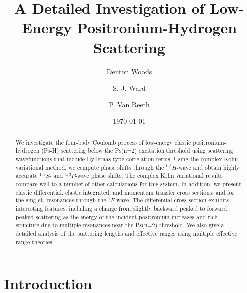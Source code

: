 \documentclass[preprint,showpacs,showkeys,preprintnumbers,amsmath,amssymb,longbibliography,pra,aps]{revtex4-1}
\begin{document}

\title{A Detailed Investigation of Low-Energy Positronium-Hydrogen Scattering}

\author{Denton Woods}

\author{S. J. Ward}

\author{P. Van Reeth}

\date{\today}

\begin{abstract}
We investigate the four-body Coulomb process of low-energy elastic
positronium-hydrogen (Ps-H) scattering below the Ps(n=2) excitation threshold
using scattering wavefunctions that include Hylleraas-type 
correlation terms. Using the complex Kohn variational method, we 
compute phase shifts through the $^{1,3}H$-wave and obtain highly accurate
$^{1,3}S$- and $^{1,3}P$-wave phase shifts. The complex
Kohn variational results compare well to a number of other calculations for 
this system. In addition, we present elastic 
differential, elastic integrated, and momentum transfer
cross sections, and for the singlet, resonances through the
$^1F$-wave. The differential cross section exhibits interesting features,
including a change from slightly backward peaked to
forward peaked scattering as the energy of the incident
positronium increases and
rich structure due to multiple resonances near the Ps(n=2) threshold.
We also give a detailed analysis of the scattering lengths
and effective ranges using multiple effective range theories.
\end{abstract}

   
\maketitle

\section{\label{sec:Intro}\protect Introduction}


\end{document}
